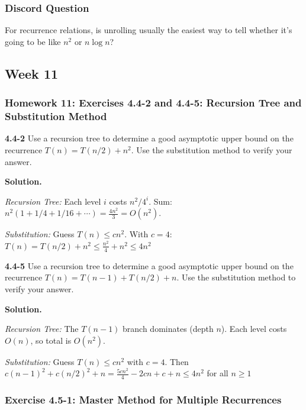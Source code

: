 \documentclass{article}
\theoremstyle{theorem}
\theoremstyle{definition}
\theoremstyle{remark}
\begin{document}
\vspace{0.4cm}

\subsubsection{Discord Question}

For recurrence relations, is unrolling usually the easiest way to tell whether it’s going to be like $n^2$ or $n\log n$?

\subsection{Week 11}

\subsubsection{Homework 11: Exercises 4.4-2 and 4.4-5: Recursion Tree and Substitution Method}

\textbf{4.4-2}
Use a recursion tree to determine a good asymptotic upper bound on the recurrence $T(n)=T(n/2)+n^2$. Use the substitution method to verify your answer.

\textbf{Solution.}

\textit{Recursion Tree:} Each level $i$ costs $n^2/4^i$. Sum: $n^2(1 + 1/4 + 1/16 + \cdots) = \frac{4n^2}{3} = O(n^2)$.

\textit{Substitution:} Guess $T(n) \le cn^2$. With $c=4$: $T(n) = T(n/2) + n^2 \le \frac{n^2}{4} + n^2 \le 4n^2$ \checkmark

\vspace{0.3cm}
\textbf{4.4-5}
Use a recursion tree to determine a good asymptotic upper bound on the recurrence $T(n)=T(n-1)+T(n/2)+n$. Use the substitution method to verify your answer.

\textbf{Solution.}

\textit{Recursion Tree:} The $T(n-1)$ branch dominates (depth $n$). Each level costs $O(n)$, so total is $O(n^2)$.

\textit{Substitution:} Guess $T(n) \le cn^2$ with $c=4$. Then $c(n-1)^2 + c(n/2)^2 + n = \frac{5cn^2}{4} - 2cn + c + n \le 4n^2$ for all $n \ge 1$ \checkmark

\vspace{0.3cm}

\subsubsection{Exercise 4.5-1: Master Method for Multiple Recurrences}
\end{document}
